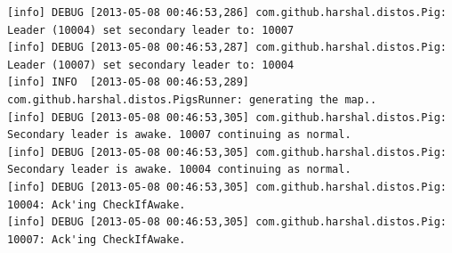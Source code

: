 \documentclass[]{article}
\begin{document}
\begin{verbatim}
[info] DEBUG [2013-05-08 00:46:53,286] com.github.harshal.distos.Pig: Leader (10004) set secondary leader to: 10007
[info] DEBUG [2013-05-08 00:46:53,287] com.github.harshal.distos.Pig: Leader (10007) set secondary leader to: 10004
[info] INFO  [2013-05-08 00:46:53,289] com.github.harshal.distos.PigsRunner: generating the map..
[info] DEBUG [2013-05-08 00:46:53,305] com.github.harshal.distos.Pig: Secondary leader is awake. 10007 continuing as normal.
[info] DEBUG [2013-05-08 00:46:53,305] com.github.harshal.distos.Pig: Secondary leader is awake. 10004 continuing as normal.
[info] DEBUG [2013-05-08 00:46:53,305] com.github.harshal.distos.Pig: 10004: Ack'ing CheckIfAwake.
[info] DEBUG [2013-05-08 00:46:53,305] com.github.harshal.distos.Pig: 10007: Ack'ing CheckIfAwake.
\end{verbatim}


\normalsize
\end{document}
